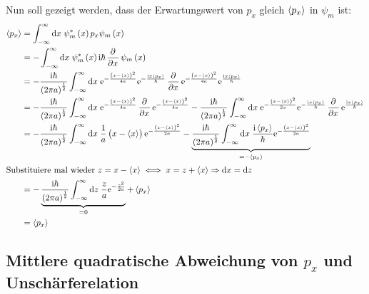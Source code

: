 Nun soll gezeigt werden, dass der Erwartungswert von $p_x$ gleich $\left\langle p_x\right\rangle$ in $\psi_m$ ist:
\begin{align*}
	\mw{p_x}&=\ui{x}\psi_m^*\del{x}p_x\psi_m\del{x}\\
	&=-\ui{x}\psi_m^*\del{x}\ii\hbar\dpd{}{x}\psi_m\del{x}\\
	&=-\frac{\ii\hbar}{\del{2\pi a}^{\frac12}}\ui{x}\ee^{-\frac{\del{x-\mw{x}}^2}{4a}}\ee^{-\frac{\ii x\mw{p_x}}{\hbar}}
	\dpd{}{x}\ee^{-\frac{\del{x-\mw{x}}^2}{4a}}\ee^{\frac{\ii x\mw{p_x}}{\hbar}}\\
	&=-\frac{\ii\hbar}{\del{2\pi a}^{\frac12}}\ui{x}\ee^{-\frac{\del{x-\mw{x}}^2}{4a}}\dpd{}{x}\ee^{-\frac{\del{x-\mw{x}}^2}{4a}}
	-\frac{\ii\hbar}{\del{2\pi a}^{\frac12}}\ui{x}\ee^{-\frac{\del{x-\mw{x}}^2}{2a}}\ee^{-\frac{\ii x\mw{p_x}}{\hbar}}
	\dpd{}{x}\ee^{\frac{\ii x\mw{p_x}}{\hbar}}\\
	&=-\frac{\ii\hbar}{\del{2\pi a}^{\frac12}}\ui{x}\frac1a\del{x-\mw{x}}\ee^{-\frac{\del{x-\mw{x}}^2}{2a}}
	-\underbrace{\frac{\ii\hbar}{\del{2\pi a}^{\frac12}}\ui{x}\frac{\ii\mw{p_x}}{\hbar}\ee^{-\frac{\del{x-\mw{x}}^2}{2a}}}_{=-\mw{p_x}}\\
	\intertext{%
		Substituiere mal wieder $z=x-\mw{x}\iff x=z+\mw{x}\Rightarrow\dif x=\dif z$
	}
	&=-\underbrace{\frac{\ii\hbar}{\del{2\pi a}^{\frac12}}\ui{z}\frac za\ee^{-\frac{z^2}{2a}}}_{=0}+\mw{p_x}\\
	&=\mw{p_x}
\end{align*}

\subsection{Mittlere quadratische Abweichung von $p_x$ und Unschärferelation}

